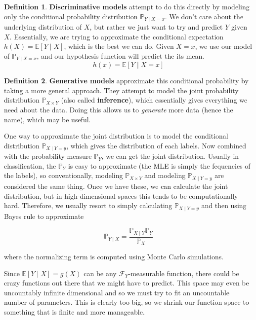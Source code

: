 \documentclass{article}
\theoremstyle{definition}
\newtheorem{definition}{Definition}[section]
\begin{document}
    \begin{definition}
      \textbf{Discriminative models} attempt to do this directly by  modeling only the conditional probability distribution $\mathbb{P}_{Y \mid X = x}$. We don't care about the underlying distribution of $X$, but rather we just want to try and predict $Y$ given $X$. Essentially, we are trying to approximate the conditional expectation $h(X) = \mathbb{E}[Y \mid X]$, which is the best we can do. Given $X = x$, we use our model of $\mathbb{P}_{Y \mid X = x}$, and our hypothesis function will predict the its mean. 
        \[h(x) = \mathbb{E}[Y \mid X = x]\]
    \end{definition}

    \begin{definition}
      \textbf{Generative models} approximate this conditional probability by taking a more general approach. They attempt to model the joint probability distribution $\mathbb{P}_{X \times Y}$ (also called \textbf{inference}), which essentially gives everything we need about the data. Doing this allows us to \textit{generate} more data (hence the name), which may be useful. 
          
      One way to approximate the joint distribution is to model the conditional distribution $\mathbb{P}_{X \mid Y = y}$, which gives the distribution of each labels. Now combined with the probability measure $\mathbb{P}_Y$, we can get the joint distribution. Usually in classification, the $\mathbb{P}_Y$ is easy to approximate (the MLE is simply the fequencies of the labels), so conventionally, modeling $\mathbb{P}_{X \times Y}$ and modeling $\mathbb{P}_{X \mid Y = y}$ are considered the same thing. Once we have these, we can calculate the joint distribution, but in high-dimensional spaces this tends to be computationally hard. Therefore, we usually resort to simply calculating $\mathbb{P}_{X \mid Y = y}$ and then using Bayes rule to approximate 

        \[\mathbb{P}_{Y \mid X} = \frac{\mathbb{P}_{X \mid Y} \mathbb{P}_Y}{\mathbb{P}_X}\]

      where the normalizing term is computed using Monte Carlo simulations. 
    \end{definition}

    Since $\mathbb{E}[Y \mid X] = g(X)$ can be any $\mathcal{F}_Y$-measurable function, there could be crazy functions out there that we might have to predict. This space may even be uncountably infinite dimensional and so we must try to fit an uncountable number of parameters. This is clearly too big, so we shrink our function space to something that is finite and more manageable. 
\end{document}
